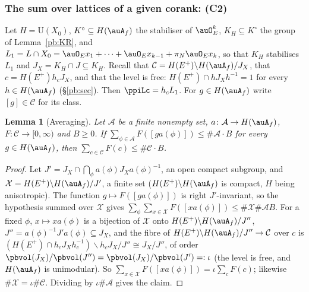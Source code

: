 \documentclass[10pt]{amsart}
\newtheorem{lemma}[theorem]{Lemma}
\theoremstyle{definition}
\theoremstyle{remark}
\providecommand{\auU}{\mathrm U}
\begin{document}
\subsubsection{The sum over lattices of a given corank: (C2)}\label{pbc:ss-C2}

Let $H=\auU(X_0)$, $K^\circ\subseteq H(\auA_f)$ the stabiliser of $\auO_E^k$, $K_H\subseteq K^\circ$ the group of
Lemma~\ref{pb:KR}, and $L_1=L\cap X_0=\auO_Ex_1+\dots+\auO_Ex_{k-1}+\pi_N\auO_Ex_k$, so that $K_H$ stabilises
$L_1$ and $J_X=K_H\cap J\subseteq K_H$. Recall that $\mathcal C=H(E^+)\backslash H(\auA_f)/J_X$, that $c=
H(E^+)h_cJ_X$, and that the level is free: $H(E^+)\cap hJ_Xh^{-1}=1$ for every $h\in H(\auA_f)$
(\S\ref{pb:sec}). Then $\ppiLc=h_cL_1$. For $g\in H(\auA_f)$ write $[g]\in\mathcal C$ for its class.

\begin{lemma}[Averaging]\label{pbc:average}
Let $\mathcal A$ be a finite nonempty set, $a\colon\mathcal A\to H(\auA_f)$, $F\colon\mathcal C\to[0,
\infty)$ and $B\ge0$. If $\sum_{\phi\in\mathcal A}F([ga(\phi)])\le\#\mathcal A\cdot B$ for every $g\in
H(\auA_f)$, then $\sum_{c\in\mathcal C}F(c)\le\#\mathcal C\cdot B$.
\end{lemma}
\begin{proof}
Let $J'=J_X\cap\bigcap_\phi a(\phi)J_Xa(\phi)^{-1}$, an open compact subgroup, and $\mathcal X=H(E^+)
\backslash H(\auA_f)/J'$, a finite set ($H(E^+)\backslash H(\auA_f)$ is compact, $H$ being anisotropic).
The function $g\mapsto F([ga(\phi)])$ is right $J'$-invariant, so the hypothesis summed over $\mathcal
X$ gives $\sum_\phi\sum_{x\in\mathcal X}F([xa(\phi)])\le\#\mathcal X\#\mathcal A B$. For a fixed $\phi$,
$x\mapsto xa(\phi)$ is a bijection of $\mathcal X$ onto $H(E^+)\backslash H(\auA_f)/J''$, $J''=a(\phi)^{-1}
J'a(\phi)\subseteq J_X$, and the fibre of $H(E^+)\backslash H(\auA_f)/J''\to\mathcal C$ over $c$ is
$(H(E^+)\cap h_cJ_Xh_c^{-1})\backslash h_cJ_X/J''\cong J_X/J''$, of order $\pbvol(J_X)/\pbvol(J'')=
\pbvol(J_X)/\pbvol(J')=:\iota$ (the level is free, and $H(\auA_f)$ is unimodular). So $\sum_{x\in\mathcal
X}F([xa(\phi)])=\iota\sum_cF(c)$; likewise $\#\mathcal X=\iota\#\mathcal C$. Dividing by $\iota\#\mathcal A$
gives the claim.
\end{proof}
\end{document}
